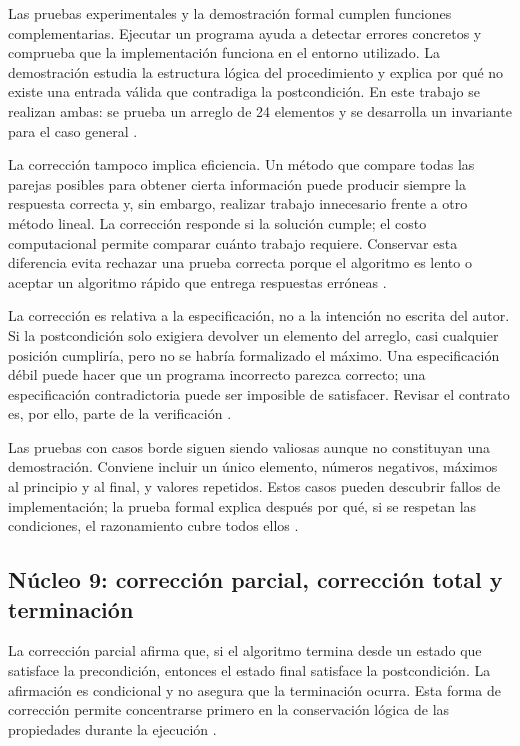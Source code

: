 \documentclass[12pt,letterpaper]{article}
\begin{document}
Las pruebas experimentales y la demostración formal cumplen funciones complementarias. Ejecutar un programa ayuda a detectar errores concretos y comprueba que la implementación funciona en el entorno utilizado. La demostración estudia la estructura lógica del procedimiento y explica por qué no existe una entrada válida que contradiga la postcondición. En este trabajo se realizan ambas: se prueba un arreglo de 24 elementos y se desarrolla un invariante para el caso general \citep{hoare1969,dijkstra1975,cormen2022}.

La corrección tampoco implica eficiencia. Un método que compare todas las parejas posibles para obtener cierta información puede producir siempre la respuesta correcta y, sin embargo, realizar trabajo innecesario frente a otro método lineal. La corrección responde si la solución cumple; el costo computacional permite comparar cuánto trabajo requiere. Conservar esta diferencia evita rechazar una prueba correcta porque el algoritmo es lento o aceptar un algoritmo rápido que entrega respuestas erróneas \citep{cormen2022,skiena2020,sedgewick2011}.

La corrección es relativa a la especificación, no a la intención no escrita del autor. Si la postcondición solo exigiera devolver un elemento del arreglo, casi cualquier posición cumpliría, pero no se habría formalizado el máximo. Una especificación débil puede hacer que un programa incorrecto parezca correcto; una especificación contradictoria puede ser imposible de satisfacer. Revisar el contrato es, por ello, parte de la verificación \citep{hoare1969,apt2009,dijkstra1975}.

Las pruebas con casos borde siguen siendo valiosas aunque no constituyan una demostración. Conviene incluir un único elemento, números negativos, máximos al principio y al final, y valores repetidos. Estos casos pueden descubrir fallos de implementación; la prueba formal explica después por qué, si se respetan las condiciones, el razonamiento cubre todos ellos \citep{cormen2022,apt2009,goodrichpy2013}.

\subsection{Núcleo 9: corrección parcial, corrección total y terminación}

La corrección parcial afirma que, si el algoritmo termina desde un estado que satisface la precondición, entonces el estado final satisface la postcondición. La afirmación es condicional y no asegura que la terminación ocurra. Esta forma de corrección permite concentrarse primero en la conservación lógica de las propiedades durante la ejecución \citep{zanabria2026,hoare1969,dijkstra1975}.
\end{document}
